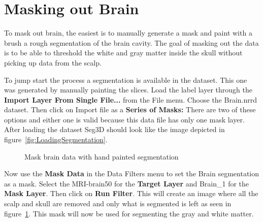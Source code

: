 \documentclass[fleqn,11pt,openany]{book}
\begin{document}
\section{Masking out Brain}

To mask out brain, the easiest is to manually generate a mask and paint with a brush a rough segmentation of the brain cavity. The goal of masking out the data is to be able to threshold the white and gray matter inside the skull without picking up data from the scalp.

To jump start the process a segmentation is available in the dataset. This one was generated by manually painting the slices. Load the label layer through the {\bf Import Layer From Single File...} from the  File menu. Choose the Brain.nrrd dataset.  Then click on Import file as a {\bf Series of Masks:} There are two of these options and either one is valid because this data file has only one mask layer.  After loading the dataset Seg3D should look like the image depicted in figure~\ref{fig:LoadingSegmentation}.

\begin{figure}
\caption{Mask brain data with hand painted segmentation}\label{fig:MaskDataBrain}
\end{figure}

Now use the {\bf Mask Data} in the Data Filters menu to set the  Brain segmentation as a mask. Select the MRI-brain50 for the {\bf Target Layer} and Brain\_1 for the {\bf Mask Layer}. Then click on {\bf Run Filter}. This will create an image where all the scalp and skull are removed and only what is segmented is left as seen in figure~\ref{fig:MaskDataBrain}. This mask will now be used for segmenting the gray and white matter.
\end{document}
